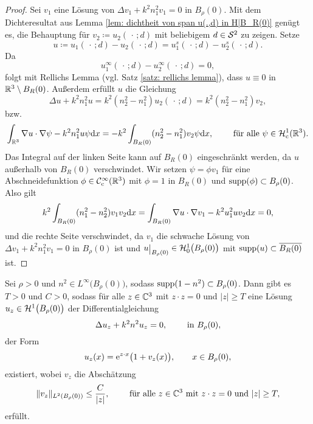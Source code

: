 \begin{proof}
	Sei \(v_1\) eine Lösung von \(\Delta v_1+k^2n_1^2v_1=0\) in \(B_\rho(0)\). Mit dem Dichteresultat aus Lemma \ref{lem: dichtheit von span u(.,d) in H|B_R(0)} genügt es, die Behauptung für \(v_2\coloneqq u_2(\,\cdot\,;d)\) mit beliebigem \(d\in\mathcal{S}^2\) zu zeigen. Setze
	\begin{equation*}
		u\coloneqq u_1(\,\cdot\,;d)-u_2(\,\cdot\,;d)=u_1^s(\,\cdot\,;d)-u_2^s(\,\cdot\,;d).
	\end{equation*}
	Da
	\begin{equation*}
		u_1^\infty(\,\cdot\,;d)-u_2^\infty(\,\cdot\,;d)=0,
	\end{equation*}
	folgt mit Rellichs Lemma (vgl. Satz \ref{satz: rellichs lemma}), dass \(u\equiv0\) in \(\mathbb{R}^3\setminus B_R(0)\). Außerdem erfüllt \(u\) die Gleichung
	\begin{equation*}
		\Delta u+k^2n_1^2u=k^2(n_2^2-n_1^2)u_2(\,\cdot\,;d)=k^2(n_2^2-n_1^2)v_2,
	\end{equation*}
	bzw.
	\begin{equation*}
		\int_{\mathbb{R}^3}\nabla u\cdot\nabla\psi-k^2n_1^2u\psi\mathrm{d}x=-k^2\int_{B_R(0)}(n_2^2-n_1^2)v_2\psi\mathrm{d}x,\qquad\text{ für alle }\psi\in\mathcal{H}_{\mathrm{c}}^1(\mathbb{R}^3).
	\end{equation*}
	Das Integral auf der linken Seite kann auf \(B_R(0)\) eingeschränkt werden, da \(u\) außerhalb von \(B_R(0)\) verschwindet. Wir setzen \(\psi=\phi v_1\) für eine Abschneidefunktion \(\phi\in\mathcal{C}_{\mathrm{c}}^\infty(\mathbb{R}^3)\) mit \(\phi=1\) in \(B_R(0)\) und \(\operatorname{supp}(\phi)\subset B_\rho(0)\). Also gilt
	\begin{equation*}
		k^2\int_{B_R(0)}(n_1^2-n_2^2)v_1v_2\mathrm{d}x=\int_{B_R(0)}\nabla u\cdot \nabla v_1-k^2u_1^2uv_2\mathrm{d}x=0,
	\end{equation*}
	und die rechte Seite verschwindet, da \(v_1\) die schwache Lösung von \(\Delta v_1+k^2n_1^2v_1=0\) in \(B_\rho(0)\) ist und \(u\restrict{B_\rho(0)}\in\H_0^1\big(B_\rho(0)\big)\) mit \(\operatorname{supp}(u)\subset\overline{B_R(0)}\) ist.
\end{proof}
\begin{satz}\label{satz: existenz der lsg für die helmholtzgleichung mit u_z in B_rho}
	Sei \(\rho>0\) und \(n^2\in L^\infty\big(B_\rho(0)\big)\), sodass \(\operatorname{supp}(1-n^2)\subset B_\rho(0)\). Dann gibt es \(T>0\) und \(C>0\), sodass für alle \(z\in\mathbb{C}^3\) mit \(z\cdot z=0\) und \(|z|\geq T\) eine Lösung \(u_z\in\mathcal{H}^1\big(B_\rho(0)\big)\) der Differentialgleichung
	\begin{equation}
		\label{helmholtzgleichung mit u_z in B_rho(0)}
		\Delta u_z+k^2n^2u_z=0,\qquad\text{ in }B_\rho(0),
	\end{equation}
	der Form
	\begin{equation}
		\label{lösung der helmholtzgleichung mit u_z in B_rho(0)}
		u_z(x)=\mathrm{e}^{z\cdot x}\big(1+v_z(x)\big),\qquad x\in B_\rho(0),
	\end{equation}
	existiert, wobei \(v_z\) die Abschätzung
	\begin{equation}
		\label{abschätzung des teils v_z der lösung der helmholtzgleichung mit u_z in B_rho(0)}
		\|v_z\|_{L^2(B_\rho(0))}\leq\frac{C}{|z|},\qquad\text{ für alle }z\in\mathbb{C}^3\text{ mit }z\cdot z=0\text{ und }|z|\geq T,
	\end{equation}
	erfüllt.
\end{satz}

